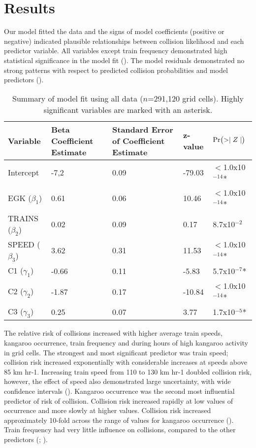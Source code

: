 \section{Results}

Our model fitted the data and the signs of model coefficients (positive or negative) indicated plausible relationships between collision likelihood and each predictor variable.  All variables except train frequency demonstrated high statistical significance in the model fit (). The model residuals demonstrated no strong patterns with respect to predicted collision probabilities and model predictors ().

\begin{table}[htp]
\caption[Summary of kangaroo-train collision model fit]{Summary of model fit using all data ($n$=291,120 grid cells).  Highly significant variables are marked with an asterisk.}
\begin{tabularx}{\textwidth}{lllll} \toprule
Variable			&Beta Coefficient Estimate	&Standard Error of Coefficient Estimate	&z-value &$\text{Pr}\bigl( >\mid Z \mid \bigr)$ \\ \midrule 
Intercept			&-7,2						&0.09	&-79.03 	&$<$1.0x10$^{-14}$* \\ 
EGK	($\beta_1$)		&0.61						&0.06	&10.46		&$<$1.0x10$^{-14}$* \\ 
TRAINS ($\beta_2$)	&0.02						&0.09	&0.17		&8.7x10$^{-2}$ \\ 
SPEED ($\beta_3$)	&3.62						&0.31	&11.53		&$<$1.0x10$^{-14}$* \\ 
C1 ($\gamma_1$)		&-0.66						&0.11 	&-5.83		&5.7x10$^{-7}$* \\
C2 ($\gamma_2$)		&-1.87						&0.17	&-10.84		&$<$1.0x10$^{-14}$* \\
C3 ($\gamma_3$)		&0.25						&0.07	&3.77		&1.7x10$^{-5}$* \\
\bottomrule
\end{tabularx}
\label{train_coefs}
\end{table}

The relative risk of collisions increased with higher average train speeds, kangaroo occurrence, train frequency and during hours of high kangaroo activity in grid cells. The strongest and most significant predictor was train speed; collision risk increased exponentially with considerable increases at speeds above 85 km hr-1.  Increasing train speed from 110 to 130 km hr-1 doubled collision risk, however, the effect of speed also demonstrated large uncertainty, with wide confidence intervals (). Kangaroo occurrence was the second most influential predictor of risk of collision.  Collision risk increased rapidly at low values of occurrence and more slowly at higher values.  Collision risk increased approximately 10-fold across the range of values for kangaroo occurrence (). Train frequency had very little influence on collisions, compared to the other predictors (; ).

